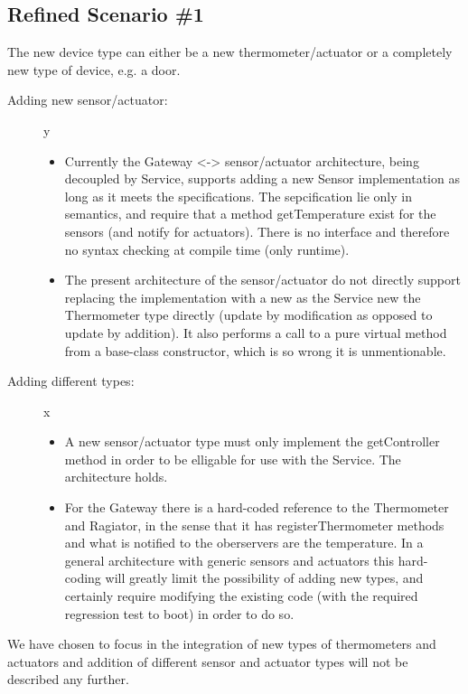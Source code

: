 \documentclass[a4paper,10pt]{article}
\begin{document}
\subsection{Refined Scenario \#1}
The new device type can either be a new thermometer/actuator or a completely new type of device, e.g. a door. 

\begin{description}
\item[Adding new sensor/actuator:] y
\begin{itemize}
\item Currently the Gateway <-> sensor/actuator architecture, being decoupled by Service, supports adding a new Sensor implementation as long as it meets the specifications. The sepcification lie only in semantics, and require that a method getTemperature exist for the sensors (and notify for actuators). There is no interface and therefore no syntax checking at compile time (only runtime).
\item The present architecture of the sensor/actuator do not directly support replacing the implementation with a new as the Service new the Thermometer type directly (update by modification as opposed to update by addition). It also performs a call to a pure virtual method from a base-class constructor, which is so wrong it is unmentionable.
\end{itemize}
\item[Adding different types:] x
\begin{itemize}
\item A new sensor/actuator type must only implement the getController method in order to be elligable for use with the Service. The architecture holds.
\item For the Gateway there is a hard-coded reference to the Thermometer and Ragiator, in the sense that it has registerThermometer methods and what is notified to the oberservers are the temperature. In a general architecture with generic sensors and actuators this hard-coding will greatly limit the possibility of adding new types, and certainly require modifying the existing code (with the required regression test to boot) in order to do so. 
\end{itemize}
\end{description}

We have chosen to focus in the integration of new types of thermometers and actuators and
addition of different sensor and actuator types will not be described any further.
\end{document}
